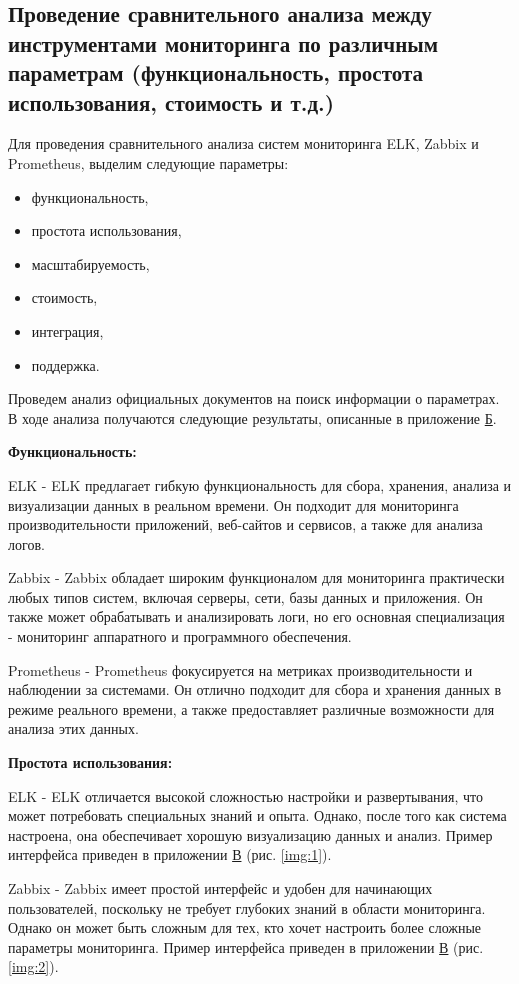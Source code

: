 \subsection{Проведение сравнительного анализа между инструментами мониторинга по различным параметрам (функциональность, простота использования, стоимость и т.д.)}

Для проведения сравнительного анализа систем мониторинга ELK, Zabbix и Prometheus, выделим следующие параметры:
\begin{itemize}
    \item функциональность,
    \item простота использования,
    \item масштабируемость,
    \item стоимость,
    \item интеграция,
    \item поддержка.
\end{itemize}

Проведем анализ официальных документов на поиск информации о параметрах. В ходе анализа получаются следующие результаты, описанные в приложение \hyperlink{app-b}{Б}.

\textbf{Функциональность:}

ELK - ELK предлагает гибкую функциональность для сбора, хранения, анализа и визуализации данных в реальном времени.
Он подходит для мониторинга производительности приложений, веб-сайтов и сервисов, а также для анализа логов.

Zabbix - Zabbix обладает широким функционалом для мониторинга практически любых типов систем, включая серверы, сети,
базы данных и приложения. Он также может обрабатывать и анализировать логи, но его основная специализация -
мониторинг аппаратного и программного обеспечения.

Prometheus - Prometheus фокусируется на метриках производительности и наблюдении за системами.
Он отлично подходит для сбора и хранения данных в режиме реального времени, а также предоставляет различные
возможности для анализа этих данных.

\textbf{Простота использования:}

ELK - ELK отличается высокой сложностью настройки и развертывания, что может потребовать специальных знаний и опыта.
Однако, после того как система настроена, она обеспечивает хорошую визуализацию данных и анализ. Пример интерфейса приведен в приложении \hyperlink{app-c}{В} (рис. \ref{img:1}).

Zabbix - Zabbix имеет простой интерфейс и удобен для начинающих пользователей, поскольку не требует глубоких
знаний в области мониторинга. Однако он может быть сложным для тех, кто хочет настроить более сложные параметры мониторинга.
Пример интерфейса приведен в приложении \hyperlink{app-c}{В} (рис. \ref{img:2}).

